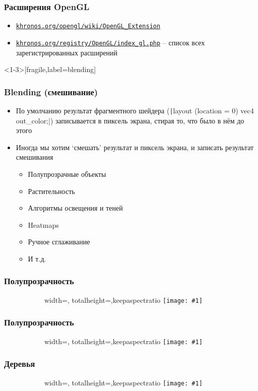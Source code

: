 \documentclass[10pt]{beamer}
\newcommand{\slideimage}[1]{
  \begin{figure}
    \begin{adjustbox}{width=\textwidth, totalheight=\textheight-2\baselineskip-2\baselineskip,keepaspectratio}
      \texttt{[image: \#1]}
    \end{adjustbox}
  \end{figure}
}
\begin{document}
\begin{frame}[fragile]
\frametitle{Расширения OpenGL}
\begin{itemize}
\item \href{https://www.khronos.org/opengl/wiki/OpenGL_Extension}{\texttt{khronos.org/opengl/wiki/OpenGL\_Extension}}
\item \href{https://www.khronos.org/registry/OpenGL/index_gl.php}{\texttt{khronos.org/registry/OpenGL/index\_gl.php}} -- список всех зарегистрированных расширений
\end{itemize}
\end{frame}

\begin{frame}<1-3>[fragile,label=blending]
\frametitle{Blending (смешивание)}
\begin{itemize}
\item По умолчанию результат фрагментного шейдера (\texttt|layout (location = 0) vec4 out_color;|) записывается в пиксель экрана, стирая то, что было в нём до этого
\pause
\item Иногда мы хотим `смешать' результат и пиксель экрана, и записать результат смешивания
\pause
\begin{itemize}
\item Полупрозрачные объекты
\pause
\item Растительность
\pause
\item Алгоритмы освещения и теней
\pause
\item Heatmaps
\pause
\item Ручное сглаживание
\pause
\item И т.д.
\end{itemize}
\end{itemize}
\end{frame}

\begin{frame}
\frametitle{Полупрозрачность}
\begin{figure}
\slideimage{window.png}
\end{figure}
\end{frame}

\begin{frame}
\frametitle{Полупрозрачность}
\begin{figure}
\slideimage{macos-ui.png}
\end{figure}
\end{frame}


\begin{frame}
\frametitle{Деревья}
\begin{figure}
\slideimage{birch.png}
\end{figure}
\end{frame}
\end{document}
